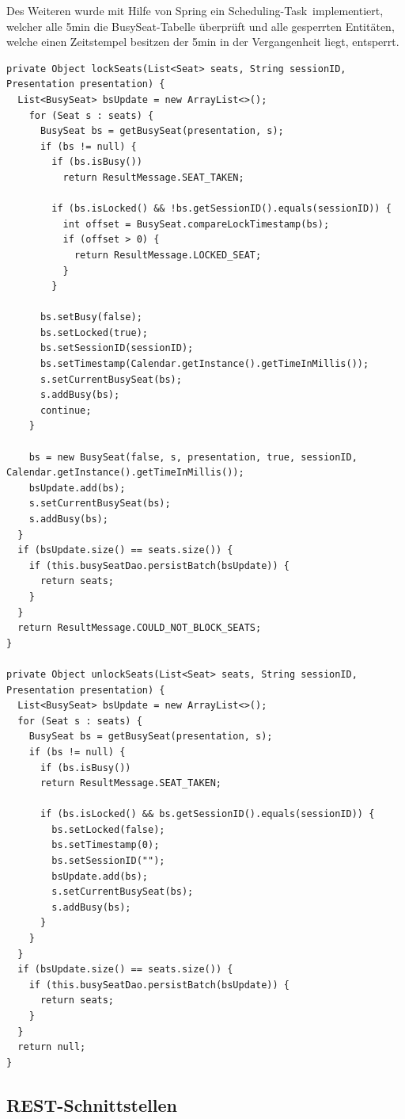 	Des Weiteren wurde mit Hilfe von Spring ein \glqq Scheduling-Task\grqq \, implementiert, welcher alle 5min die BusySeat-Tabelle überprüft und alle gesperrten Entitäten, welche einen Zeitstempel besitzen der 5min in der Vergangenheit liegt, entsperrt.

\lstset{language=Java}
\begin{lstlisting}[caption={Implementierung zum Sperren von Sitzen}, label={lst:lockProcess}]
private Object lockSeats(List<Seat> seats, String sessionID, Presentation presentation) {
  List<BusySeat> bsUpdate = new ArrayList<>();
    for (Seat s : seats) {
      BusySeat bs = getBusySeat(presentation, s);
      if (bs != null) {
        if (bs.isBusy())
          return ResultMessage.SEAT_TAKEN;

        if (bs.isLocked() && !bs.getSessionID().equals(sessionID)) {
          int offset = BusySeat.compareLockTimestamp(bs);
          if (offset > 0) {
            return ResultMessage.LOCKED_SEAT;
          }
        }

      bs.setBusy(false);
      bs.setLocked(true);
      bs.setSessionID(sessionID);
      bs.setTimestamp(Calendar.getInstance().getTimeInMillis());
      s.setCurrentBusySeat(bs);
      s.addBusy(bs);
      continue;
    }

    bs = new BusySeat(false, s, presentation, true, sessionID, Calendar.getInstance().getTimeInMillis());
    bsUpdate.add(bs);
    s.setCurrentBusySeat(bs);
    s.addBusy(bs);
  }
  if (bsUpdate.size() == seats.size()) {
    if (this.busySeatDao.persistBatch(bsUpdate)) {
      return seats;
    }
  }
  return ResultMessage.COULD_NOT_BLOCK_SEATS;
}

private Object unlockSeats(List<Seat> seats, String sessionID, Presentation presentation) {
  List<BusySeat> bsUpdate = new ArrayList<>();
  for (Seat s : seats) {
    BusySeat bs = getBusySeat(presentation, s);
    if (bs != null) {
      if (bs.isBusy())
      return ResultMessage.SEAT_TAKEN;

      if (bs.isLocked() && bs.getSessionID().equals(sessionID)) {
        bs.setLocked(false);
        bs.setTimestamp(0);
        bs.setSessionID("");
        bsUpdate.add(bs);
        s.setCurrentBusySeat(bs);
        s.addBusy(bs);
      }
    }  
  }
  if (bsUpdate.size() == seats.size()) {
    if (this.busySeatDao.persistBatch(bsUpdate)) {
      return seats;
    }
  }
  return null;
}

\end{lstlisting}

	\subsection{REST-Schnittstellen}
	
